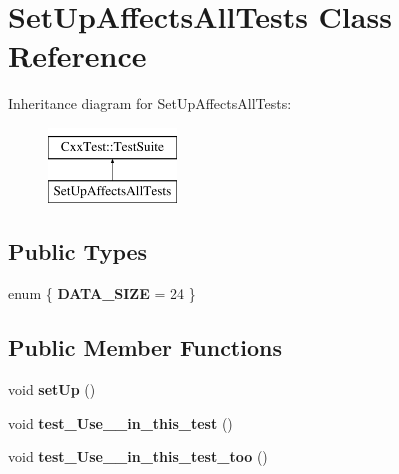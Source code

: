 \hypertarget{classSetUpAffectsAllTests}{\section{Set\-Up\-Affects\-All\-Tests Class Reference}
\label{classSetUpAffectsAllTests}
}
Inheritance diagram for Set\-Up\-Affects\-All\-Tests\-:\begin{figure}[H]
\begin{center}
\leavevmode
\includegraphics[height=2.000000cm]{classSetUpAffectsAllTests}
\end{center}
\end{figure}
\subsection*{Public Types}
\begin{DoxyCompactItemize}
\item 
enum \{ {\bfseries D\-A\-T\-A\-\_\-\-S\-I\-Z\-E} = 24
 \}
\end{DoxyCompactItemize}
\subsection*{Public Member Functions}
\begin{DoxyCompactItemize}
\item 
\hypertarget{classSetUpAffectsAllTests_aab028d88b3151b08238c62fd849639eb}{void {\bfseries set\-Up} ()}\label{classSetUpAffectsAllTests_aab028d88b3151b08238c62fd849639eb}

\item 
\hypertarget{classSetUpAffectsAllTests_ae4b0fcbc6835981dbe32c71f49a1371b}{void {\bfseries test\-\_\-\-Use\-\_\-\_\-in\-\_\-this\-\_\-test} ()}\label{classSetUpAffectsAllTests_ae4b0fcbc6835981dbe32c71f49a1371b}

\item 
\hypertarget{classSetUpAffectsAllTests_a1ce83112c9edaa1b36a71e5a88378f63}{void {\bfseries test\-\_\-\-Use\-\_\-\_\-in\-\_\-this\-\_\-test\-\_\-too} ()}\label{classSetUpAffectsAllTests_a1ce83112c9edaa1b36a71e5a88378f63}

\end{DoxyCompactItemize}

